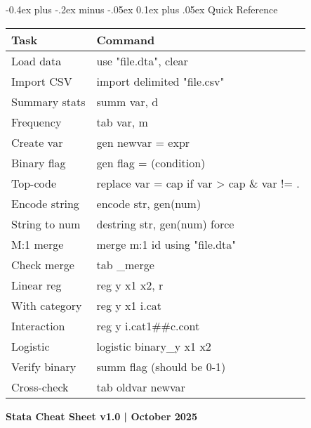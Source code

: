 \documentclass[8pt,letterpaper]{article}
\makeatletter
\renewcommand{\subsection}{\@startsection{subsection}{2}{0mm}%
                                {-0.4ex plus -.2ex minus -.05ex}%
                                {0.1ex plus .05ex}%
                                {\normalfont\fontsize{7.5pt}{7.5pt}\selectfont\bfseries\color{myblue}}}
\makeatother
\begin{document}
\begin{multicols}{2}
\subsection{Quick Reference}

\fontsize{6pt}{6.5pt}\selectfont
\begin{tabular}{@{}ll@{}}
\hline\textbf{Task} & \textbf{Command} \\
\hline
Load data & use "file.dta", clear \\
Import CSV & import delimited "file.csv" \\
Summary stats & summ var, d \\
Frequency & tab var, m \\
Create var & gen newvar = expr \\
Binary flag & gen flag = (condition) \\
Top-code & replace var = cap if var > cap \& var != . \\
Encode string & encode str, gen(num) \\
String to num & destring str, gen(num) force \\
M:1 merge & merge m:1 id using "file.dta" \\
Check merge & tab \_merge \\
Linear reg & reg y x1 x2, r \\
With category & reg y x1 i.cat \\
Interaction & reg y i.cat1\#\#c.cont \\
Logistic & logistic binary\_y x1 x2 \\
Verify binary & summ flag (should be 0-1) \\
Cross-check & tab oldvar newvar \\
\hline
\end{tabular}
\normalsize

\vspace{0.1cm}
{\fontsize{5pt}{6pt}\selectfont \textbf{Stata Cheat Sheet v1.0 | October 2025}}

\end{multicols}
\end{document}
